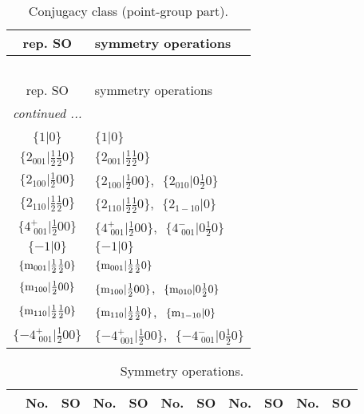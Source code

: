 \documentclass[fleqn,10pt,landscape]{article}
\begin{document}
\begin{itemize}
\begin{center}
\renewcommand{\arraystretch}{1.3}
\begin{longtable}{c|l}
\caption{Conjugacy class (point-group part).}
 \\
 \hline \hline
rep. SO & symmetry operations \\ \hline \endfirsthead

\multicolumn{1}{l}{\tablename\ \thetable{}} \\
 \hline \hline
rep. SO & symmetry operations \\ \hline \endhead

 \hline \hline
\multicolumn{1}{r}{\footnotesize\it continued ...} \\ \endfoot

 \hline \hline
\multicolumn{1}{r}{} \\ \endlastfoot

$\{1|0\}$ & $\{1|0\}$ \\ \hline
$\{2{}_{001}|\frac{1}{2} \frac{1}{2} 0\}$ & $\{2{}_{001}|\frac{1}{2} \frac{1}{2} 0\}$ \\ \hline
$\{2{}_{100}|\frac{1}{2} 0 0\}$ & $\{2{}_{100}|\frac{1}{2} 0 0\}$,\,\, $\{2{}_{010}|0 \frac{1}{2} 0\}$ \\ \hline
$\{2{}_{110}|\frac{1}{2} \frac{1}{2} 0\}$ & $\{2{}_{110}|\frac{1}{2} \frac{1}{2} 0\}$,\,\, $\{2{}_{1-10}|0\}$ \\ \hline
$\{4^{+}_{\,\,001}|\frac{1}{2} 0 0\}$ & $\{4^{+}_{\,\,001}|\frac{1}{2} 0 0\}$,\,\, $\{4^{-}_{\,\,001}|0 \frac{1}{2} 0\}$ \\ \hline
$\{-1|0\}$ & $\{-1|0\}$ \\ \hline
$\{{\rm m}_{001}|\frac{1}{2} \frac{1}{2} 0\}$ & $\{{\rm m}_{001}|\frac{1}{2} \frac{1}{2} 0\}$ \\ \hline
$\{{\rm m}_{100}|\frac{1}{2} 0 0\}$ & $\{{\rm m}_{100}|\frac{1}{2} 0 0\}$,\,\, $\{{\rm m}_{010}|0 \frac{1}{2} 0\}$ \\ \hline
$\{{\rm m}_{110}|\frac{1}{2} \frac{1}{2} 0\}$ & $\{{\rm m}_{110}|\frac{1}{2} \frac{1}{2} 0\}$,\,\, $\{{\rm m}_{1-10}|0\}$ \\ \hline
$\{-4^{+}_{\,\,001}|\frac{1}{2} 0 0\}$ & $\{-4^{+}_{\,\,001}|\frac{1}{2} 0 0\}$,\,\, $\{-4^{-}_{\,\,001}|0 \frac{1}{2} 0\}$ \\
\end{longtable}
\end{center}
\begin{center}
\renewcommand{\arraystretch}{1.3}
\begin{longtable}{c|cc|cc|cc|cc|cc}
\caption{Symmetry operations.}
 \\
 \hline \hline
 & No. & SO & No. & SO & No. & SO & No. & SO & No. & SO \\ \hline \endfirsthead


\end{longtable}
\end{center}
\end{itemize}
\end{document}
